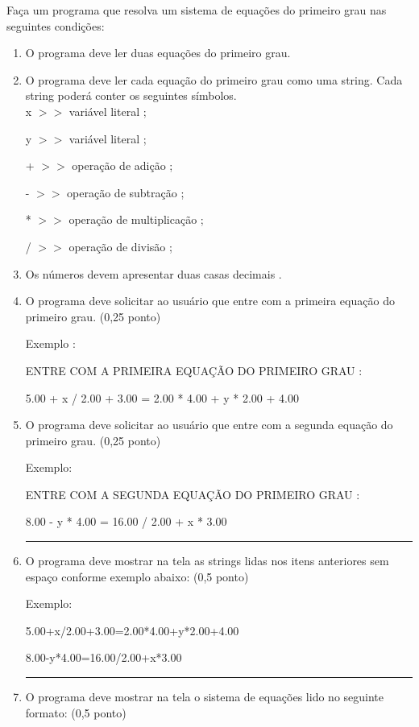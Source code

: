 \documentclass[12pt,a4paper]{article}
\begin{document}
Faça um programa que resolva um sistema de equações do primeiro grau nas seguintes condições:
\begin{enumerate}[label=\arabic*.]
\item O programa deve ler duas equações do primeiro grau.
\item O programa deve ler cada equação do primeiro grau como uma string. Cada string poderá conter os
seguintes símbolos.\\

x $>>$ variável literal ;

y $>>$ variável literal ;

+ $>>$ operação de adição ;

- $>>$ operação de subtração ;

* $>>$ operação de multiplicação ;

/ $>>$ operação de divisão ;\\

\item Os números devem apresentar duas casas decimais .
\item O programa deve solicitar ao usuário que entre com a primeira equação do primeiro grau. (0,25
ponto)

Exemplo :

ENTRE COM A PRIMEIRA EQUAÇÃO DO PRIMEIRO GRAU :

5.00 + x / 2.00 + 3.00 = 2.00 * 4.00 + y * 2.00 + 4.00


\item O programa deve solicitar ao usuário que entre com a segunda equação do primeiro grau. (0,25
ponto)

Exemplo:

ENTRE COM A SEGUNDA EQUAÇÃO DO PRIMEIRO GRAU :

8.00 - y * 4.00 = 16.00 / 2.00 + x * 3.00

\rule{16cm}{0.01cm}

\item O programa deve mostrar na tela as strings lidas nos itens anteriores sem espaço conforme exemplo
abaixo: (0,5 ponto)

Exemplo:

5.00+x/2.00+3.00=2.00*4.00+y*2.00+4.00

8.00-y*4.00=16.00/2.00+x*3.00

\rule{16cm}{0.01cm}

\item O programa deve mostrar na tela o sistema de equações lido no seguinte formato: (0,5 ponto)


\end{enumerate}
\end{document}
